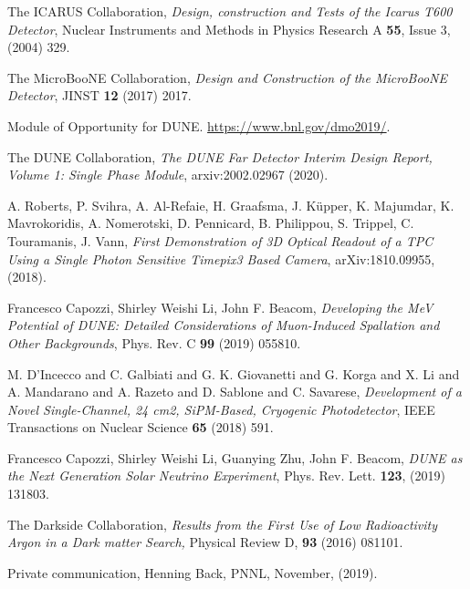 \documentclass[a4paper,11pt]{article}
\begin{document}
\begin{thebibliography}{99}

The ICARUS Collaboration, \emph{Design, construction and Tests of the Icarus T600 Detector}, Nuclear Instruments and Methods in Physics Research A {\bf 55}, Issue 3, (2004) 329.

The MicroBooNE Collaboration, \emph{Design and Construction of the MicroBooNE Detector}, JINST {\bf 12} (2017) 2017.

{Module of Opportunity for DUNE}.
\newblock \url{https://www.bnl.gov/dmo2019/}.


The DUNE Collaboration, \emph{The DUNE Far Detector Interim Design Report, Volume 1: Single Phase Module}, arxiv:2002.02967 (2020).

A. Roberts, P. Svihra, A. Al-Refaie, H. Graafsma, J. K{\"u}pper, K. Majumdar, K. Mavrokoridis, A. Nomerotski, D. Pennicard, B. Philippou, S. Trippel, C. Touramanis, J. Vann, \emph{First Demonstration of 3D Optical Readout of a TPC Using a Single Photon Sensitive Timepix3 Based Camera}, arXiv:1810.09955, (2018).

Francesco Capozzi, Shirley Weishi Li, John F. Beacom, \emph{Developing the MeV Potential of DUNE: Detailed Considerations of Muon-Induced Spallation and Other Backgrounds}, Phys. Rev. C {\bf 99} (2019) 055810.

M. {D'Incecco} and C. {Galbiati} and G. K. {Giovanetti} and G. {Korga} and X. {Li} and A. {Mandarano} and A. {Razeto} and D. {Sablone} and C. {Savarese}, \emph{Development of a Novel Single-Channel, 24 cm2, SiPM-Based, Cryogenic Photodetector}, IEEE Transactions on Nuclear Science {\bf 65} (2018) 591.

Francesco Capozzi, Shirley Weishi Li, Guanying Zhu, John F. Beacom, \emph{DUNE as the Next Generation Solar Neutrino Experiment}, Phys. Rev. Lett. {\bf 123}, (2019) 131803.

The Darkside Collaboration, \emph {Results from the First Use of Low Radioactivity Argon in a Dark matter Search,} Physical Review D, {\bf 93} (2016) 081101.

Private communication, Henning Back, PNNL, November, (2019).


\end{thebibliography}
\end{document}
